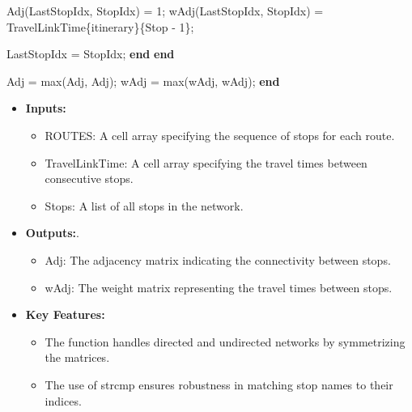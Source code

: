 \documentclass[
  letterpaper,
  DIV=11,
  numbers=noendperiod]{scrartcl}
\newenvironment{Shaded}{\begin{snugshade}}{\end{snugshade}}
\newcommand{\FloatTok}[1]{\textcolor[rgb]{0.68,0.00,0.00}{#1}}
\newcommand{\KeywordTok}[1]{\textcolor[rgb]{0.00,0.23,0.31}{\textbf{#1}}}
\newcommand{\NormalTok}[1]{\textcolor[rgb]{0.00,0.23,0.31}{#1}}
\newcommand{\OperatorTok}[1]{\textcolor[rgb]{0.37,0.37,0.37}{#1}}
\newcommand{\VariableTok}[1]{\textcolor[rgb]{0.07,0.07,0.07}{#1}}
\providecommand{\tightlist}{%
  \setlength{\itemsep}{0pt}\setlength{\parskip}{0pt}}\usepackage{longtable,booktabs,array}
\begin{document}
\begin{Shaded}
\begin{Highlighting}[]
            \VariableTok{Adj}\NormalTok{(}\VariableTok{LastStopIdx}\OperatorTok{,} \VariableTok{StopIdx}\NormalTok{) }\OperatorTok{=} \FloatTok{1}\OperatorTok{;}
            \VariableTok{wAdj}\NormalTok{(}\VariableTok{LastStopIdx}\OperatorTok{,} \VariableTok{StopIdx}\NormalTok{) }\OperatorTok{=} \VariableTok{TravelLinkTime}\NormalTok{\{}\VariableTok{itinerary}\NormalTok{\}\{}\VariableTok{Stop} \OperatorTok{{-}} \FloatTok{1}\NormalTok{\}}\OperatorTok{;}

            \VariableTok{LastStopIdx} \OperatorTok{=} \VariableTok{StopIdx}\OperatorTok{;}
        \KeywordTok{end}
    \KeywordTok{end}

    \VariableTok{Adj} \OperatorTok{=} \VariableTok{max}\NormalTok{(}\VariableTok{Adj}\OperatorTok{,} \VariableTok{Adj}\OperatorTok{\textquotesingle{}}\NormalTok{)}\OperatorTok{;}
    \VariableTok{wAdj} \OperatorTok{=} \VariableTok{max}\NormalTok{(}\VariableTok{wAdj}\OperatorTok{,} \VariableTok{wAdj}\OperatorTok{\textquotesingle{}}\NormalTok{)}\OperatorTok{;}
\KeywordTok{end}
\end{Highlighting}
\end{Shaded}

\begin{itemize}
\tightlist
\item
  \textbf{Inputs:}

  \begin{itemize}
  \tightlist
  \item
    ROUTES: A cell array specifying the sequence of stops for each
    route.
  \item
    TravelLinkTime: A cell array specifying the travel times between
    consecutive stops.
  \item
    Stops: A list of all stops in the network.
  \end{itemize}
\item
  \textbf{Outputs:}.

  \begin{itemize}
  \tightlist
  \item
    Adj: The adjacency matrix indicating the connectivity between stops.
  \item
    wAdj: The weight matrix representing the travel times between stops.
  \end{itemize}
\item
  \textbf{Key Features:}

  \begin{itemize}
  \tightlist
  \item
    The function handles directed and undirected networks by
    symmetrizing the matrices.
  \item
    The use of strcmp ensures robustness in matching stop names to their
    indices.
  \end{itemize}
\end{itemize}
\end{document}
